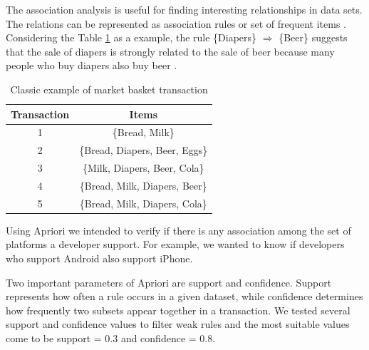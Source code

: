 \documentclass[10pt, conference]{IEEEtran}
\begin{document}
The association analysis is useful for finding interesting relationships in data  sets. The relations can be represented as association rules or set of frequent items \cite{Tan2005}. Considering the Table \ref{examplerule} as a example, the rule \{Diapers\} $\Rightarrow$ \{Beer\} suggests that the sale of diapers is strongly related to the sale of beer because many people who buy diapers also buy beer \cite{Tan2005}.   
\begin{table}[h]
\renewcommand{\arraystretch}{1.3}
\caption{Classic example of market basket transaction}
\label{examplerule}
\centering
\begin{tabular}{|c|c|}
\hline
 Transaction & Items \\
\hline
1&    \{Bread, Milk\}\\
2&    \{Bread, Diapers, Beer, Eggs\}\\
3&    \{Milk, Diapers, Beer, Cola\}\\
4&    \{Bread, Milk, Diapers, Beer\}\\
5&    \{Bread, Milk, Diapers, Cola\}\\
\hline
\end{tabular}
\end{table}



Using Apriori we intended to verify if there is any association among the set of platforms a developer support. For example, we wanted to know if developers who support Android also support iPhone.


Two important parameters of Apriori are support and confidence. Support represents how often a rule occurs in a given dataset, while confidence determines how frequently two subsets appear together in a transaction. 
We tested several support and confidence values to filter weak rules and the most suitable values come to be support = 0.3 and confidence = 0.8.     

\end{document}
